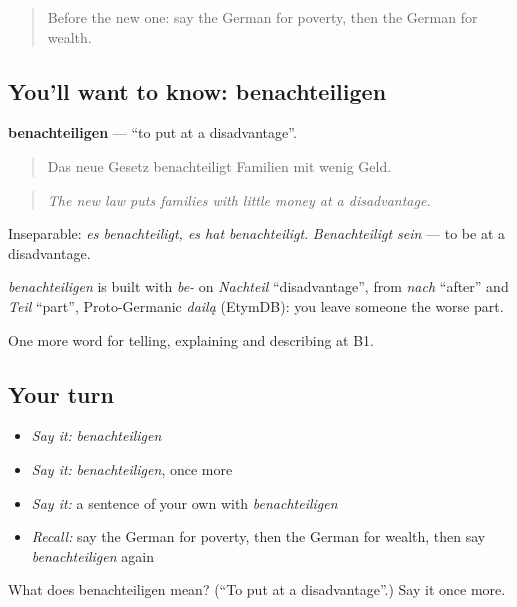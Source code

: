 \label{lesson:GE-C359-benachteiligen}



\begin{quote}
Before the new one: say the German for poverty, then the German for wealth.
\end{quote}

\subsection*{You'll want to know: benachteiligen}
\textbf{benachteiligen} — \textquotedblleft{}to put at a disadvantage\textquotedblright{}.

\begin{quote}
Das neue Gesetz benachteiligt Familien mit wenig Geld.
\end{quote}

\begin{quote}
\emph{The new law puts families with little money at a disadvantage.}
\end{quote}

Inseparable: \emph{es benachteiligt, es hat benachteiligt}. \emph{Benachteiligt sein} — to be at a disadvantage.

\begin{cousinweb}
\emph{benachteiligen} is built with \emph{be-} on \emph{Nachteil} \textquotedblleft{}disadvantage\textquotedblright{}, from \emph{nach} \textquotedblleft{}after\textquotedblright{} and \emph{Teil} \textquotedblleft{}part\textquotedblright{}, Proto-Germanic \emph{dailą} (EtymDB): you leave someone the worse part.
\end{cousinweb}

\begin{grammarlens}[title={What you've built}]
One more word for telling, explaining and describing at B1.
\end{grammarlens}

\subsection*{Your turn}
\begin{itemize}
\raggedright
  \item \emph{Say it:} \emph{benachteiligen}
  \item \emph{Say it:} \emph{benachteiligen}, once more
  \item \emph{Say it:} a sentence of your own with \emph{benachteiligen}
  \item \emph{Recall:} say the German for poverty, then the German for wealth, then say \emph{benachteiligen} again
\end{itemize}

\begin{tcolorbox}[breakable,colback=teal!4,colframe=teal!35!black,title={Before you move on}]
What does benachteiligen mean? (\textquotedblleft{}To put at a disadvantage\textquotedblright{}.) Say it once more.
\end{tcolorbox}
